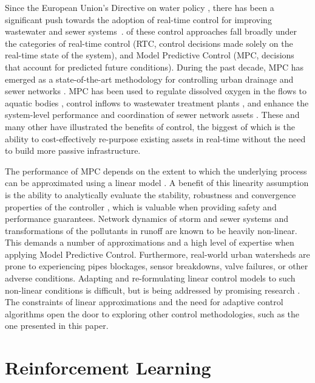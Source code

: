 Since the European Union’s Directive on water policy \cite{TheEuropeanParliamentandthecouncilofEuropeanUnion2000}, there has been a significant push towards the adoption of real-time control for improving wastewater and sewer systems~\cite{Schutze2004RealToday,Mollerup2016}.
\Many of these control approaches fall broadly under the categories of real-time control (RTC, control decisions made solely on the real-time state of the system), and Model Predictive Control (MPC, decisions that account for predicted future conditions).
During the past decade, MPC has emerged as a state-of-the-art methodology for  controlling urban drainage and sewer networks .
MPC has been used to regulate dissolved oxygen in the flows to aquatic bodies \cite{Mahmoodian2017Pollution-basedPropagation}, control inflows to wastewater treatment plants \cite{pleau2005global}, and enhance the system-level performance and coordination of sewer network assets \cite{Mollerup2016,Meneses2018CoordinatingDenmark}.
These and many other   \cite{wong2018real} have illustrated the benefits of control, the biggest of which is the ability to cost-effectively re-purpose existing assets in real-time without the need to build more passive infrastructure.

The performance of MPC depends on the extent to which the underlying process can be approximated using a linear model \cite{van2006model}.
A benefit of this linearity assumption is the ability to analytically evaluate the stability, robustness and convergence properties of the controller \cite{Ogata201}, which is valuable when providing safety and performance guarantees.
Network dynamics of storm and sewer systems and transformations of the pollutants in runoff are known to be heavily non-linear.
This demands a number of approximations and a high level of expertise when applying Model Predictive Control.
Furthermore, real-world urban watersheds are prone to experiencing pipes blockages, sensor breakdowns, valve failures, or other adverse conditions.
Adapting and re-formulating linear control models to such non-linear conditions is difficult, but is being addressed by promising research \cite{wong2018real}.
The constraints of linear approximations and the need for adaptive control algorithms open the door to exploring other control methodologies, such as the one presented in this paper.

\section{Reinforcement Learning}

